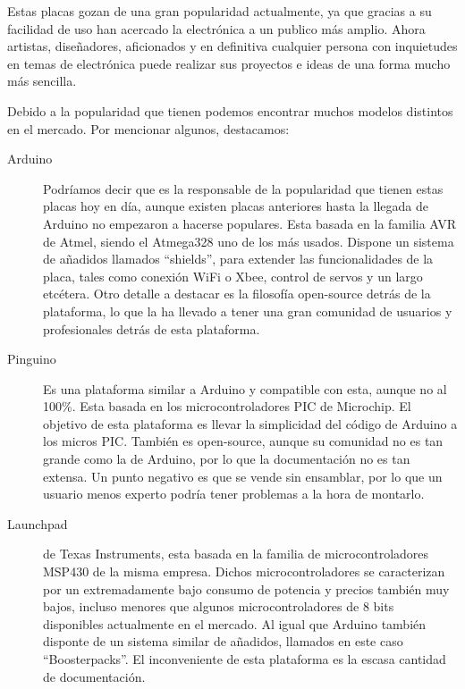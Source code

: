Estas placas gozan de una gran popularidad actualmente, ya que gracias a su facilidad de uso han acercado la electrónica a un publico más amplio. Ahora artistas, diseñadores, aficionados y en definitiva cualquier persona con inquietudes en temas de electrónica puede realizar sus proyectos e ideas de una forma mucho más sencilla.



Debido a la popularidad que tienen podemos encontrar muchos modelos distintos en el mercado. Por mencionar algunos, destacamos: 
\begin{description}
\item[Arduino] Podríamos decir que es la responsable de la popularidad que tienen estas placas hoy en día, aunque existen placas anteriores hasta la llegada de Arduino no empezaron a hacerse populares. Esta basada en la familia AVR de Atmel, siendo el Atmega328 uno de los más usados. Dispone un sistema de añadidos llamados “shields”, para extender las funcionalidades de la placa, tales como conexión WiFi o Xbee, control de servos y un largo etcétera. Otro detalle a destacar es la filosofía open-source detrás de la plataforma, lo que la ha llevado a tener una gran comunidad de usuarios y profesionales detrás de esta plataforma.

\item[Pinguino] Es una plataforma similar a Arduino y compatible con esta, aunque no al 100\%. Esta basada en los microcontroladores PIC de Microchip. El objetivo de esta plataforma es llevar la simplicidad del código de Arduino a los micros PIC. También es open-source, aunque su comunidad no es tan grande como la de Arduino, por lo que la documentación no es tan extensa. Un punto negativo es que se vende sin ensamblar, por lo que un usuario menos experto podría tener problemas a la hora de montarlo.

\item[Launchpad] de Texas Instruments, esta basada en la familia de microcontroladores MSP430 de la misma empresa. Dichos microcontroladores se caracterizan por un extremadamente bajo consumo de potencia y precios también muy bajos, incluso menores que algunos microcontroladores de 8 bits disponibles actualmente en el mercado. Al igual que Arduino también disponte de un sistema similar de añadidos, llamados en este caso “Boosterpacks”. El inconveniente de esta plataforma es la escasa cantidad de documentación.
\end{description}



